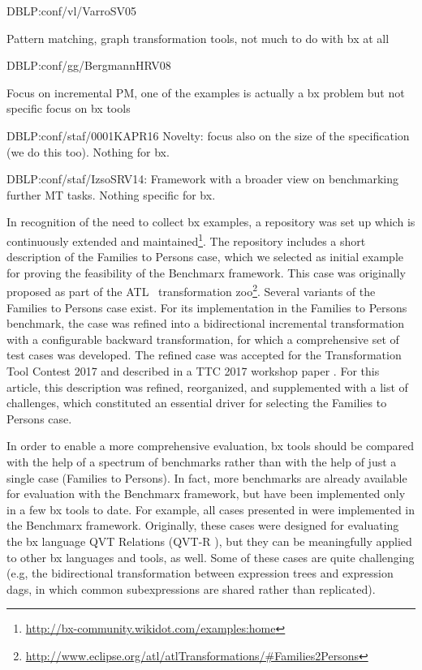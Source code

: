 DBLP:conf/vl/VarroSV05

Pattern matching, graph transformation tools, not much to do with bx at all

DBLP:conf/gg/BergmannHRV08

Focus on incremental PM, one of the examples is actually a bx problem but not specific focus on bx tools

DBLP:conf/staf/0001KAPR16
Novelty:  focus also on the size of the specification (we do this too). Nothing for bx.

DBLP:conf/staf/IzsoSRV14:  Framework with a broader view on benchmarking further MT tasks.  Nothing specific for bx.

In recognition of the need to collect bx examples, a repository \cite{Cheney2014} was set up which is continuously extended and maintained\footnote{\url{http://bx-community.wikidot.com/examples:home}}. The repository includes a short description of the Families to Persons case, which we selected as initial example for proving the feasibility of the Benchmarx framework. This case was originally proposed as part of the ATL~\cite{SCP-Jouault2008} transformation zoo\footnote{\url{http://www.eclipse.org/atl/atlTransformations/\#Families2Persons}}. Several variants of the Families to Persons case exist. For its implementation in the Families to Persons benchmark, the case was refined into a bidirectional incremental transformation with a configurable backward transformation, for which a comprehensive set of test cases was developed. The refined case was accepted for the Transformation Tool Contest 2017 and described in a TTC 2017 workshop paper \cite{Anjorin2017a}. For this article, this description was refined, reorganized, and supplemented with a list of challenges, which constituted an essential driver for selecting the Families to Persons case.

In order to enable a more comprehensive evaluation, bx tools should be compared with the help of a spectrum of benchmarks rather than with the help of just a single case (Families to Persons). In fact, more benchmarks are already available for evaluation with the Benchmarx framework, but have been implemented only in a few bx tools to date. For example, all cases presented in \cite{SoSym2018-Westfechtel} were implemented in the Benchmarx framework. Originally, these cases were designed for evaluating the bx language QVT Relations (QVT-R \cite{QVT-1.3}), but they can be meaningfully applied to other bx languages and tools, as well. Some of these cases are quite challenging (e.g, the bidirectional transformation between expression trees and expression dags, in which common subexpressions are shared rather than replicated).



